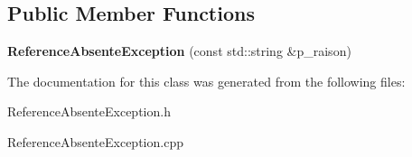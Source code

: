 \subsection*{Public Member Functions}
\begin{DoxyCompactItemize}
\item 
\hypertarget{classtp_1_1ReferenceAbsenteException_a87407d5bb43f9563a8b0f7322b15ad13}{}{\bfseries Reference\+Absente\+Exception} (const std\+::string \&p\+\_\+raison)\label{classtp_1_1ReferenceAbsenteException_a87407d5bb43f9563a8b0f7322b15ad13}

\end{DoxyCompactItemize}


The documentation for this class was generated from the following files\+:\begin{DoxyCompactItemize}
\item 
Reference\+Absente\+Exception.\+h\item 
Reference\+Absente\+Exception.\+cpp\end{DoxyCompactItemize}
